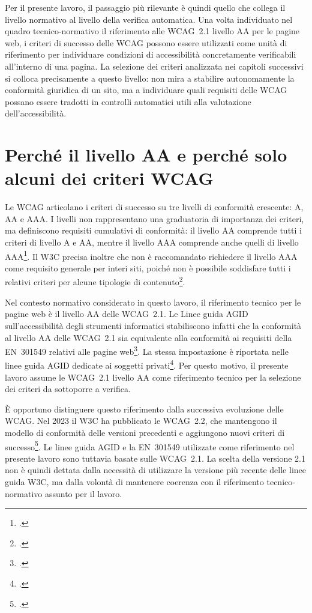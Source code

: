 Per il presente lavoro, il passaggio più rilevante è quindi quello che collega il livello normativo al livello della verifica automatica. Una volta individuato nel quadro tecnico-normativo il riferimento alle WCAG~2.1 livello AA per le pagine web, i criteri di successo delle WCAG possono essere utilizzati come unità di riferimento per individuare condizioni di accessibilità concretamente verificabili all'interno di una pagina. La selezione dei criteri analizzata nei capitoli successivi si colloca precisamente a questo livello: non mira a stabilire autonomamente la conformità giuridica di un sito, ma a individuare quali requisiti delle WCAG possano essere tradotti in controlli automatici utili alla valutazione dell'accessibilità.

\section{Perché il livello AA e perché solo alcuni dei criteri WCAG}

\label{sec:livello-aa}

Le WCAG articolano i criteri di successo su tre livelli di conformità crescente: A, AA e AAA. I livelli non rappresentano una graduatoria di importanza dei criteri, ma definiscono requisiti cumulativi di conformità: il livello AA comprende tutti i criteri di livello A e AA, mentre il livello AAA comprende anche quelli di livello AAA\footcite[§~5.2.1]{w3c:wcag21}. Il W3C precisa inoltre che non è raccomandato richiedere il livello AAA come requisito generale per interi siti, poiché non è possibile soddisfare tutti i relativi criteri per alcune tipologie di contenuto\footcite[§~5.2.1]{w3c:wcag21}.

Nel contesto normativo considerato in questo lavoro, il riferimento tecnico per le pagine web è il livello AA delle WCAG~2.1. Le Linee guida AGID sull'accessibilità degli strumenti informatici stabiliscono infatti che la conformità al livello AA delle WCAG~2.1 sia equivalente alla conformità ai requisiti della EN~301549 relativi alle pagine web\footcite[§~2.2]{agid:lg-stanca}. La stessa impostazione è riportata nelle linee guida AGID dedicate ai soggetti privati\footcite{agid:lg-stanca-1bis}. Per questo motivo, il presente lavoro assume le WCAG~2.1 livello AA come riferimento tecnico per la selezione dei criteri da sottoporre a verifica.

È opportuno distinguere questo riferimento dalla successiva evoluzione delle WCAG. Nel 2023 il W3C ha pubblicato le WCAG~2.2, che mantengono il modello di conformità delle versioni precedenti e aggiungono nuovi criteri di successo\footcite{w3c:wcag21}. Le linee guida AGID e la EN~301549 utilizzate come riferimento nel presente lavoro sono tuttavia basate sulle WCAG~2.1. La scelta della versione 2.1 non è quindi dettata dalla necessità di utilizzare la versione più recente delle linee guida W3C, ma dalla volontà di mantenere coerenza con il riferimento tecnico-normativo assunto per il lavoro.

